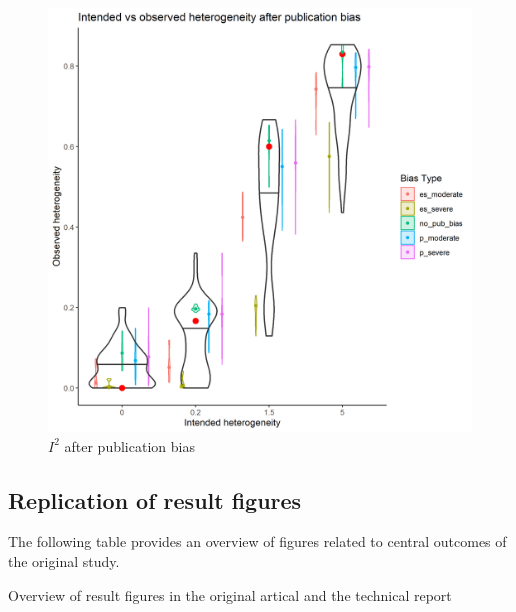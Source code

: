 \documentclass[
  english,
  doc,floatsintext,draftall]{apa6}
\begin{document}
\begin{figure}
\includegraphics[width=400pt]{../figures/i_squared_biased} \caption{$I^2$ after publication bias}\label{fig:unnamed-chunk-2}
\end{figure}

\hypertarget{replication-of-result-figures}{%
\subsection{Replication of result figures}\label{replication-of-result-figures}}

The following table provides an overview of figures related to central outcomes of the original study.

Overview of result figures in the original artical and the technical report
\end{document}
